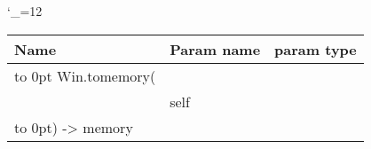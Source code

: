 \begingroup \catcode`\_=12 \tt
\begin{tabular}{lll}
\toprule
\textrm{Name}&\textrm{Param name}&\textrm{param type}\\
\midrule
\hbox to 0pt {Win.tomemory(\hss}\\
& self\\
\hbox to 0pt{) -> memory\hss}\\
\bottomrule
\end{tabular}
\endgroup

